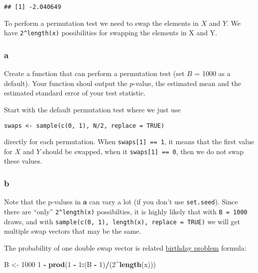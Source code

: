 \documentclass[]{article}
\newenvironment{Shaded}{\begin{snugshade}}{\end{snugshade}}
\newcommand{\DecValTok}[1]{\textcolor[rgb]{0.00,0.00,0.81}{#1}}
\newcommand{\KeywordTok}[1]{\textcolor[rgb]{0.13,0.29,0.53}{\textbf{#1}}}
\newcommand{\NormalTok}[1]{#1}
\newcommand{\OperatorTok}[1]{\textcolor[rgb]{0.81,0.36,0.00}{\textbf{#1}}}
\newcommand{\StringTok}[1]{\textcolor[rgb]{0.31,0.60,0.02}{#1}}
\begin{document}
\begin{verbatim}
## [1] -2.040649
\end{verbatim}

To perform a permutation test we need to swap the elements in \(X\) and
\(Y\). We have \texttt{2\^{}length(x)} possibilities for swapping the
elements in X and Y.

\hypertarget{a-1}{%
\subsubsection{a}\label{a-1}}

Create a function that can perform a permutation test (set \(B\) = 1000
as a default). Your function shoul output the \(p\)-value, the estimated
mean and the estimated standard error of your test statistic.

Start with the default permutation test where we just use

\texttt{swaps\ \textless{}-\ sample(c(0,\ 1),\ N/2,\ replace\ =\ TRUE)}

directly for each permutation. When \texttt{swaps{[}1{]}\ ==\ 1}, it
means that the first value for \(X\) and \(Y\) should be swapped, when
it \texttt{swaps{[}1{]}\ ==\ 0}, then we do not swap these values.

\hypertarget{b-1}{%
\subsubsection{b}\label{b-1}}

Note that the p-values in \textbf{a} can vary a lot (if you don't use
\texttt{set.seed}). Since there are ``only'' \texttt{2\^{}length(x)}
possibilties, it is highly likely that with \texttt{B\ =\ 1000} draws,
and with \texttt{sample(c(0,\ 1),\ length(x),\ replace\ =\ TRUE)} we
will get multiple swap vectors that may be the same.

The probability of one double swap vector is related
\href{https://en.wikipedia.org/wiki/Birthday_problem}{birthday problem}
formula:

\begin{Shaded}
\begin{Highlighting}[]
\NormalTok{B <-}\StringTok{ }\DecValTok{1000}
\DecValTok{1} \OperatorTok{-}\StringTok{ }\KeywordTok{prod}\NormalTok{(}\DecValTok{1} \OperatorTok{-}\StringTok{ }\DecValTok{1}\OperatorTok{:}\NormalTok{(B }\OperatorTok{-}\StringTok{ }\DecValTok{1}\NormalTok{)}\OperatorTok{/}\NormalTok{(}\DecValTok{2}\OperatorTok{^}\KeywordTok{length}\NormalTok{(x)))}
\end{Highlighting}
\end{Shaded}
\end{document}
